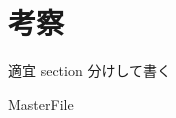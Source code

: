 \documentclass[a4j,twoside,12pt]{thesis} %
\begin{document}
\addtocounter{chapter}{+4}
\setlength{\baselineskip}{1.95zw}
\setlength{\textheight}{30\baselineskip}
\mainmatter

\fi

\chapter{考察}\label{dis}
適宜 section 分けして書く



\expandafter\ifx\csname MasterFile\endcsname\relax
\def\MasterFile{本原稿です}

% 


\end{document}
